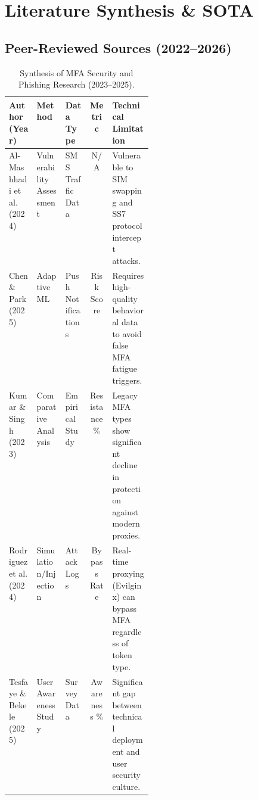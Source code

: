 \documentclass[11pt]{article}
\begin{document}
\section{Literature Synthesis \& SOTA}

\subsection{Peer-Reviewed Sources (2022--2026)}
\begin{table}[h!]
\centering
\footnotesize
\renewcommand{\arraystretch}{1.5}
\setlength{\tabcolsep}{2.5pt}
\begin{tabular}{|l|l|l|c|p{0.28\linewidth}|} 
\hline
\textbf{Author (Year)} & \textbf{Method} & \textbf{Data Type} & \textbf{Metric} & \textbf{Technical Limitation} \\ \hline \hline

Al-Mashhadi et al. (2024) \cite{almashhadi2024sms} & Vulnerability Assessment & SMS Traffic Data & N/A & Vulnerable to SIM swapping and SS7 protocol intercept attacks. \\ \hline

Chen \& Park (2025) \cite{chen2025mlpush} & Adaptive ML & Push Notifications & Risk Score & Requires high-quality behavioral data to avoid false MFA fatigue triggers. \\ \hline

Kumar \& Singh (2023) \cite{kumar2023mfatyperesist} & Comparative Analysis & Empirical Study & Resistance \% & Legacy MFA types show significant decline in protection against modern proxies. \\ \hline

Rodriguez et al. (2024) \cite{rodriguez2024evilginx} & Simulation/Injection & Attack Logs & Bypass Rate & Real-time proxying (Evilginx) can bypass MFA regardless of token type. \\ \hline

Tesfaye \& Bekele (2025) \cite{tesfaye2025ethiopia} & User Awareness Study & Survey Data & Awareness \% & Significant gap between technical deployment and user security culture. \\ \hline
\end{tabular}
\caption{Synthesis of MFA Security and Phishing Research (2023--2025).}
\end{table}
\end{document}
